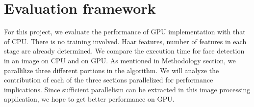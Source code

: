 \section{Evaluation framework}\label{sec:evaluation}
For this project, we evaluate the performance of GPU implementation with that of CPU.
There is no training involved. Haar features, number of features in each stage are already determined.
We compare the execution time for face detection in an image on CPU and on GPU. As mentioned in Methodology section, we
parallilize three different portions in the algorithm. We will analyze the contribution of each of
the three sections parallelized for performance implications.
Since sufficient parallelism can be extracted in this image processing application, we hope to get
better performance on GPU.

